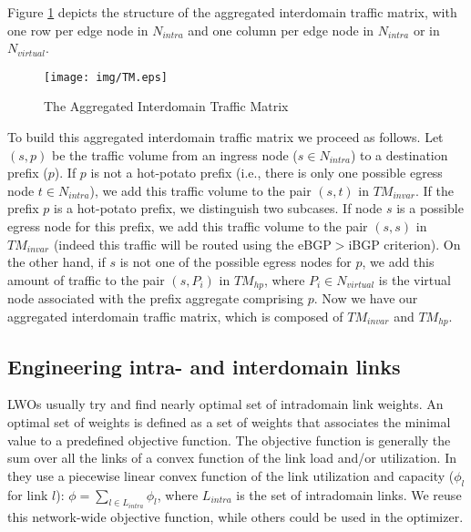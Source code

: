 \documentclass{acm_proc_article-sp}
\begin{document}
Figure \ref{fig:tm} depicts the structure of the aggregated
interdomain traffic matrix, with one row per edge node in $N_{intra}$
and one column per edge node in $N_{intra}$ or in $N_{virtual}$.

\begin{figure}[htbp]
  \centering
  \texttt{[image: img/TM.eps]}
  \caption{The Aggregated Interdomain Traffic Matrix}
  \label{fig:tm}
\end{figure}

To build this aggregated interdomain traffic matrix we proceed as follows.
Let $(s,p)$ 
be the traffic volume from an ingress node ($s \in N_{intra}$)
to a destination prefix ($p$). If 
$p$ is not a hot-potato prefix (i.e., there is only one
possible egress node $t \in N_{intra}$), we add this traffic volume 
to the pair $(s,t)$ in $TM_{invar}$. If the prefix $p$ is a hot-potato prefix, we
distinguish two subcases. If node $s$ is a possible egress node 
for this prefix, we add this 
traffic volume to the pair $(s,s)$ in $TM_{invar}$ (indeed this traffic
will be routed using the eBGP$>$iBGP criterion). On the other hand, if $s$ is not
one of the possible egress nodes for $p$, 
we add this
amount of traffic to the pair $(s,P_i)$ in $TM_{hp}$, where $P_i
\in N_{virtual}$ is the virtual node associated with the prefix aggregate 
comprising $p$. Now we have our aggregated interdomain traffic matrix,
which is composed of $TM_{invar}$ and $TM_{hp}$.

\subsection{Engineering intra- and interdomain links}
\label{engineeringinter}

LWOs usually try and find nearly optimal set of intradomain link weights.
An optimal set of weights is defined as a set of weights that
associates the minimal value to a predefined objective function. The
objective function is generally the sum over all the links 
of a convex function of the link load and/or utilization. In \cite{fortz1}
they use a piecewise linear convex function of the link utilization and
capacity ($\phi_l$ for link $l$): $\phi = \sum_{l \in L_{intra}} \phi_l$, where $L_{intra}$ is the set of
intradomain links. We reuse this network-wide objective function, while
others could be used in the optimizer.
\end{document}
